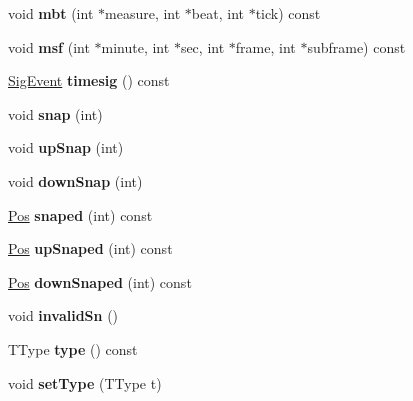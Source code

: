 \begin{DoxyCompactItemize}
void {\bfseries mbt} (int $\ast$measure, int $\ast$beat, int $\ast$tick) const
\item 
\mbox{\label{class_ms_1_1_pos_ad1a23e1596abe1d73aab32d919c96b63}} 
void {\bfseries msf} (int $\ast$minute, int $\ast$sec, int $\ast$frame, int $\ast$subframe) const
\item 
\mbox{\label{class_ms_1_1_pos_a7ffb7b41bc61c621f9520e18c9dd4f50}} 
\hyperlink{class_ms_1_1_sig_event}{Sig\+Event} {\bfseries timesig} () const
\item 
\mbox{\label{class_ms_1_1_pos_a2aa0455e14100a7b4a7ffd3afa399dfb}} 
void {\bfseries snap} (int)
\item 
\mbox{\label{class_ms_1_1_pos_adea2c8f61df5da09d534ca61dc8c3bf7}} 
void {\bfseries up\+Snap} (int)
\item 
\mbox{\label{class_ms_1_1_pos_afec7c529775ae92b184c3e3f3236d9a5}} 
void {\bfseries down\+Snap} (int)
\item 
\mbox{\label{class_ms_1_1_pos_a1bb02239519b9d61597766dacfa614e9}} 
\hyperlink{class_ms_1_1_pos}{Pos} {\bfseries snaped} (int) const
\item 
\mbox{\label{class_ms_1_1_pos_a3947ce589d96236f127d374a382ee861}} 
\hyperlink{class_ms_1_1_pos}{Pos} {\bfseries up\+Snaped} (int) const
\item 
\mbox{\label{class_ms_1_1_pos_af2aaea7896fb84c8800a5e1c43344cce}} 
\hyperlink{class_ms_1_1_pos}{Pos} {\bfseries down\+Snaped} (int) const
\item 
\mbox{\label{class_ms_1_1_pos_ae4b31a3056f3f67eb06c711ff667ad64}} 
void {\bfseries invalid\+Sn} ()
\item 
\mbox{\label{class_ms_1_1_pos_a3f793607703cf0fc220e513804d36631}} 
T\+Type {\bfseries type} () const
\item 
\mbox{\label{class_ms_1_1_pos_a3e705f34aaa595fe2d325a511ea4e528}} 
void {\bfseries set\+Type} (T\+Type t)

\end{DoxyCompactItemize}
